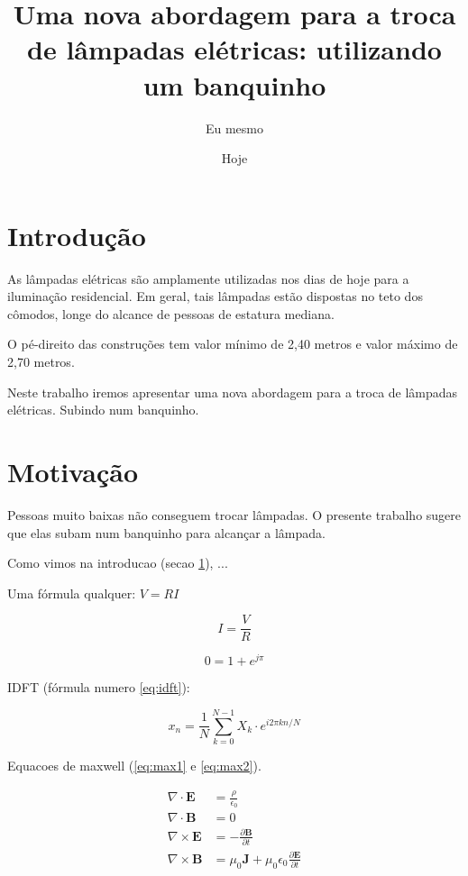 \documentclass{article}
\author{Eu mesmo}
\date{Hoje}
\title{Uma nova abordagem para a troca de
       lâmpadas elétricas: utilizando um banquinho}
\newcommand{\vetor}[1]{\textbf{#1}}
\begin{document}
\maketitle

\newpage

\section{Introdução}
\label{sec:intro}

As lâmpadas elétricas são amplamente utilizadas nos dias
de hoje para a iluminação residencial.
Em geral, tais lâmpadas estão dispostas no teto dos cômodos,
longe do alcance de pessoas de estatura mediana.

O pé-direito 
das construções tem valor mínimo de 2,40 metros e valor máximo de 2,70 metros.


Neste trabalho  iremos apresentar uma nova abordagem
para a troca  de lâmpadas elétricas.
Subindo  num  banquinho. %


\section{Motivação}
\label{sec:motiv}

Pessoas muito baixas não conseguem trocar lâmpadas.
O presente trabalho sugere que elas subam num
banquinho para alcançar a lâmpada.

\hfill

Como vimos na introducao (secao \ref{sec:intro}),
...

Uma fórmula qualquer: $V=R I$

$$I = \frac{V}{R}$$

$$0=1+e^{j\pi}$$

IDFT (fórmula numero \ref{eq:idft}):

\begin{equation}
\label{eq:idft}
x_n = \frac{1}{N}
\sum_{k=0}^{N-1} X_k \cdot
e^{i2\pi kn/N}
\end{equation}

Equacoes de maxwell (\ref{eq:max1} e \ref{eq:max2}).

\begin{align}
\label{eq:max1}
\nabla \cdot \vetor{E} & = \frac{\rho}{\epsilon_0} \\
\label{eq:max2}
\nabla \cdot \vetor{B} & = 0 \\
\nabla \times \vetor{E}
& = - \frac{\partial \vetor{B}}{\partial t} \\
\nabla \times \vetor{B} & =
\mu_0\vetor{J} + \mu_0 \epsilon_0
\frac{\partial \vetor{E}}{\partial t}
\end{align}
\end{document}

